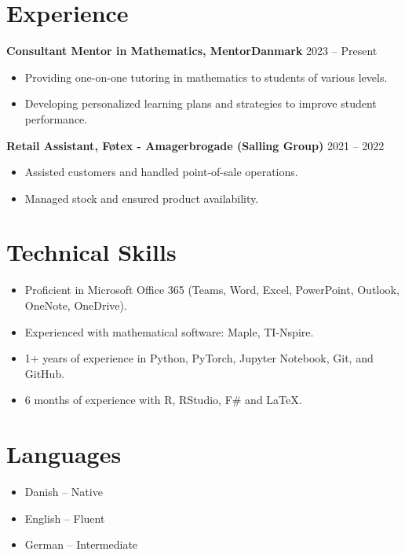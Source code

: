 \documentclass[a4paper,10pt]{article}
\begin{document}
\section*{Experience}
\textbf{Consultant Mentor in Mathematics, MentorDanmark} \hfill 2023 -- Present 
\begin{itemize}[noitemsep, topsep=0pt]
    \item Providing one-on-one tutoring in mathematics to students of various levels.
    \item Developing personalized learning plans and strategies to improve student performance.
\end{itemize}
\n
\textbf{Retail Assistant, F\o tex - Amagerbrogade (Salling Group)} \hfill 2021 -- 2022 
\begin{itemize}[noitemsep, topsep=0pt]
    \item Assisted customers and handled point-of-sale operations.
    \item Managed stock and ensured product availability.
\end{itemize}
\n
\section*{Technical Skills}
\begin{itemize}[noitemsep, topsep=0pt]
    \item Proficient in Microsoft Office 365 (Teams, Word, Excel, PowerPoint, Outlook, OneNote, OneDrive).
    \item Experienced with mathematical software: Maple, TI-Nspire.
    \item 1+ years of experience in Python, PyTorch, Jupyter Notebook, Git, and GitHub.
    \item 6 months of experience with R, RStudio, F\# and \LaTeX.
\end{itemize}

\section*{Languages}
\begin{itemize}[noitemsep, topsep=0pt]
    \item Danish -- Native
    \item English -- Fluent
    \item German -- Intermediate
\end{itemize}
\end{document}
